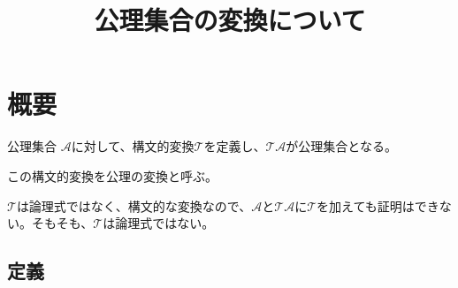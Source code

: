 \documentclass[10pt, oneside]{jarticle}   	%
\title{公理集合の変換について}
\author{\myname}
\begin{document}
\maketitle

\section{概要}
公理集合 $\mathcal{A}$に対して、構文的変換$\mathcal{T}$を定義し、$\mathcal{T}{\mathcal{A}}$が公理集合となる。

この構文的変換を公理の変換と呼ぶ。

$\mathcal{T}$は論理式ではなく、構文的な変換なので、$\mathcal{A}$と$\mathcal{T}{\mathcal{A}}$に$\mathcal{T}$を加えても証明はできない。そもそも、$\mathcal{T}$は論理式ではない。


\subsection{定義}
%
\end{document}

